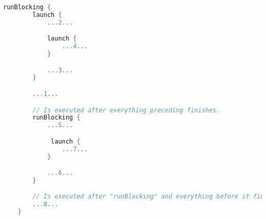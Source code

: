 \begin{lstlisting}[language=Kotlin, title={Numbers represent the~order of~execution}]
    runBlocking {
        launch {
            ...2...

            launch {
                ...4...
            }

            ...3...
        }

        ...1...

        // Is executed after everything preceding finishes.
        runBlocking {
            ...5...

             launch {
                ...7...
            }

            ...6...
        }

        // Is executed after "runBlocking" and everything before it finishes.
        ...8...
    }
\end{lstlisting}
